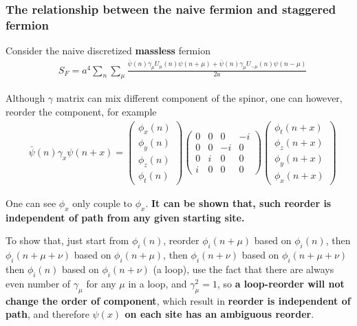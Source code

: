 \subsubsection{\label{sec:naivestaggered}The relationship between the naive fermion and staggered fermion}

Consider the naive discretized \textbf{massless} fermion
\begin{equation}
\begin{split}
&S_F=a^4\sum _n\sum _{\mu}\frac{\bar{\psi}(n)\gamma _{\mu}U_{\mu}(n) \psi (n+\mu) + \bar{\psi}(n) \gamma _{\mu}U_{-\mu}(n)\psi (n-\mu)}{2a}
\end{split}
\end{equation}

Although $\gamma$ matrix can mix different component of the spinor, one can however, reorder the component, for example
\begin{equation}
\begin{split}
&\bar{\psi}(n)\gamma _x \psi (n+x)=\begin{pmatrix} \phi _x(n) \\ \phi _y(n) \\ \phi _z(n) \\ \phi _t(n) \end{pmatrix} \begin{pmatrix} 0 & 0 & 0 & -i \\ 0 & 0 & -i & 0\\ 0 & i & 0 & 0 \\ i & 0 & 0 & 0 \end{pmatrix} \begin{pmatrix} \phi _t(n+x) \\ \phi _z(n+x) \\ \phi _y(n+x) \\ \phi _x(n+x) \end{pmatrix}
\end{split}
\end{equation}

One can see $\phi _x$ only couple to $\phi _x$. \textbf{It can be shown that, such reorder is independent of path from any given starting site.}

To show that, just start from $\phi _i(n)$, reorder $\phi _i(n+\mu)$ based on $\phi _i(n)$, then $\phi _i(n+\mu + \nu)$ based on $\phi _i(n+\mu)$, then $\phi _i(n + \nu)$ based on $\phi _i(n+\mu + \nu)$ then $\phi _i(n)$ based on $\phi _i(n+\nu)$ (a loop), use the fact that there are always even number of $\gamma _{\mu}$ for any $\mu$ in a loop, and $\gamma _{\mu}^2=1$, so \textbf{a loop-reorder will not change the order of component}, which result in \textbf{reorder is independent of path}, and therefore \textbf{$\psi (x)$ on each site has an ambiguous reorder}.


